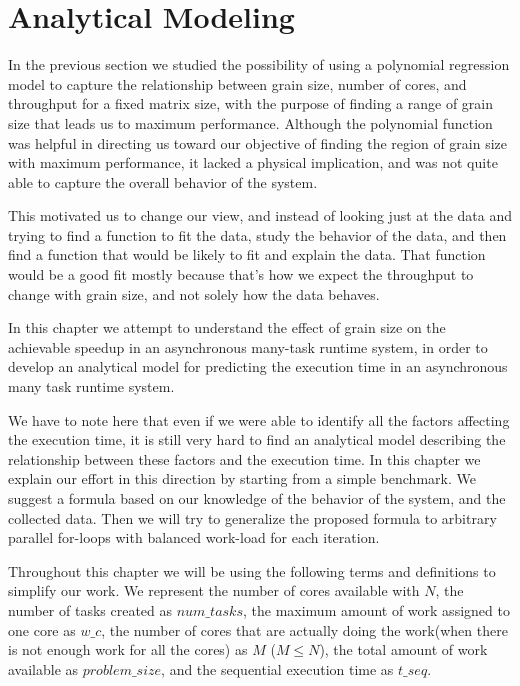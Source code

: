 \section{Analytical Modeling}
In the previous section we studied the possibility of using a polynomial regression model to capture the relationship between grain size, number of cores, and throughput for a fixed matrix size, with the purpose of finding a range of grain size that leads us to maximum performance. 
Although the polynomial function was helpful in directing us toward our objective of finding the region of grain size with maximum performance, it lacked a physical implication, and was not quite able to capture the overall behavior of the system. 

This motivated us to change our view, and instead of looking just at the data and trying to find a function to fit the data, study the behavior of the data, and then find a function that would be likely to fit and explain the data. That function would be a good fit mostly because that's how we expect the throughput to change with grain size, and not solely how the data behaves.   

In this chapter we attempt to understand the effect of grain size on the achievable speedup in an asynchronous many-task runtime system, in order to develop an analytical model for predicting the execution time in an asynchronous many task runtime system. 

We have to note here that even if we were able to identify all the factors affecting the execution time, it is still very hard to find an analytical model describing the relationship between these factors and the execution time. In this chapter we explain our effort in this direction by starting from a simple benchmark. We suggest a formula based on our knowledge of the behavior of the system, and the collected data. Then we will try to generalize the proposed formula to arbitrary parallel for-loops with balanced work-load for each iteration. 


Throughout this chapter we will be using the following terms and definitions to simplify our work. We represent the number of cores available with $N$, the number of tasks created as $num\_{tasks}$, the maximum amount of work assigned to one core as $w\_c$, the number of cores that are actually doing the work(when there is not enough work for all the cores) as $M$ ($M\leq{N}$), the total amount of work available as $problem\_{size}$, and the sequential execution time as $t\_{seq}$.

